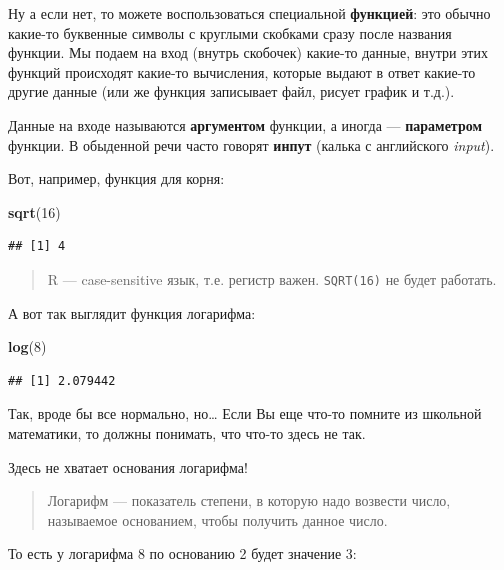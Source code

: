 \documentclass[
]{book}
\newenvironment{Shaded}{\begin{snugshade}}{\end{snugshade}}
\newcommand{\DecValTok}[1]{\textcolor[rgb]{0.00,0.00,0.81}{#1}}
\newcommand{\KeywordTok}[1]{\textcolor[rgb]{0.13,0.29,0.53}{\textbf{#1}}}
\newcommand{\NormalTok}[1]{#1}
\begin{document}
Ну а если нет, то можете воспользоваться специальной \textbf{функцией}: это обычно какие-то буквенные символы с круглыми скобками сразу после названия функции. Мы подаем на вход (внутрь скобочек) какие-то данные, внутри этих функций происходят какие-то вычисления, которые выдают в ответ какие-то другие данные (или же функция записывает файл, рисует график и т.д.).

Данные на входе называются \textbf{аргументом} функции, а иногда --- \textbf{параметром} функции. В обыденной речи часто говорят \textbf{инпут} (калька с английского \emph{input}).

Вот, например, функция для корня:

\begin{Shaded}
\begin{Highlighting}[]
\KeywordTok{sqrt}\NormalTok{(}\DecValTok{16}\NormalTok{)}
\end{Highlighting}
\end{Shaded}

\begin{verbatim}
## [1] 4
\end{verbatim}

\begin{quote}
R --- case-sensitive язык, т.е. регистр важен. \texttt{SQRT(16)} не будет работать.
\end{quote}

А вот так выглядит функция логарифма:

\begin{Shaded}
\begin{Highlighting}[]
\KeywordTok{log}\NormalTok{(}\DecValTok{8}\NormalTok{)}
\end{Highlighting}
\end{Shaded}

\begin{verbatim}
## [1] 2.079442
\end{verbatim}

Так, вроде бы все нормально, но\ldots{} Если Вы еще что-то помните из школьной математики, то должны понимать, что что-то здесь не так.

Здесь не хватает основания логарифма!

\begin{quote}
Логарифм --- показатель степени, в которую надо возвести число, называемое основанием, чтобы получить данное число.
\end{quote}

То есть у логарифма 8 по основанию 2 будет значение 3:
\end{document}
